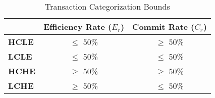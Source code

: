 \documentclass[conference]{IEEEtran}
\newtheorem{definition}{Definition}
\begin{document}

\begin{table}[h]
\captionsetup{justification=centering}
\centering
\begin{tabular}{l|c|c|}
\cline{2-3}
                                          & \multicolumn{1}{l|}{\textbf{Efficiency Rate ($E_{r}$)}} & \multicolumn{1}{l|}{\textbf{Commit Rate ($C_{r}$)}} \\ \hline
\multicolumn{1}{|l|}{\textbf{HCLE}}  & $\le$ 50\%                       & $\ge$ 50\%                               \\ \hline
\multicolumn{1}{|l|}{\textbf{LCLE}} & $\le$ 50\%                       & $\le$ 50\%                                 \\ \hline
\multicolumn{1}{|l|}{\textbf{HCHE}}  & $\ge$ 50\%                          & $\ge$ 50\%                                \\ \hline
\multicolumn{1}{|l|}{\textbf{LCHE}} & $\ge$ 50\%                          & $\le$ 50\%                                  \\ \hline
\end{tabular}
\caption{Transaction Categorization Bounds} %
\label{tbl:default_tmetrics} %
\end{table}

%  
%  
\end{document}

